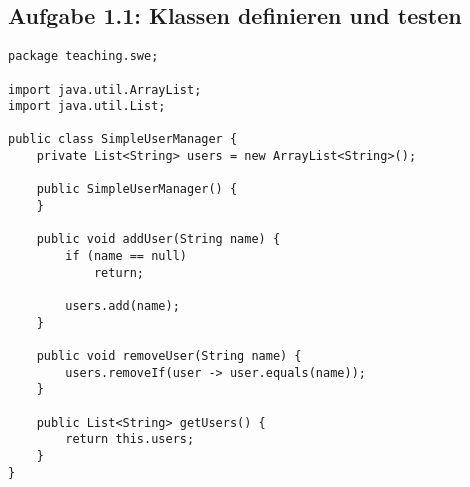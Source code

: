 \subsection*{Aufgabe 1.1: Klassen definieren und testen}

\begin{lstlisting}[style=javastyle, caption=SimpleUserManager]
package teaching.swe;

import java.util.ArrayList;
import java.util.List;

public class SimpleUserManager {
    private List<String> users = new ArrayList<String>();

    public SimpleUserManager() {
    }

    public void addUser(String name) {
        if (name == null)
            return;

        users.add(name);
    }

    public void removeUser(String name) {
        users.removeIf(user -> user.equals(name));
    }

    public List<String> getUsers() {
        return this.users;
    }
}

\end{lstlisting}

